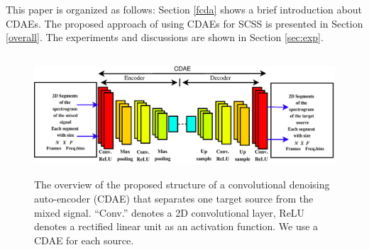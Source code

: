 \documentclass{article}
\begin{document}
This paper is organized as follows: Section \ref{fcda} shows a brief introduction about CDAEs. The proposed approach of using CDAEs for SCSS is presented in Section \ref{overall}. The experiments and discussions are shown in Section \ref{sec:exp}. %

\begin{figure}[h]
 \includegraphics[width=1\linewidth,height=4.5cm]{CDAE1.eps}%
\caption{\label{fig:cdae1}{The overview of the proposed structure of a convolutional denoising auto-encoder (CDAE) that separates one target source from the mixed signal. ``Conv.'' denotes a 2D convolutional layer, ReLU denotes a rectified linear unit as an activation function. We use a CDAE for each source.}}
\end{figure}
\end{document}
